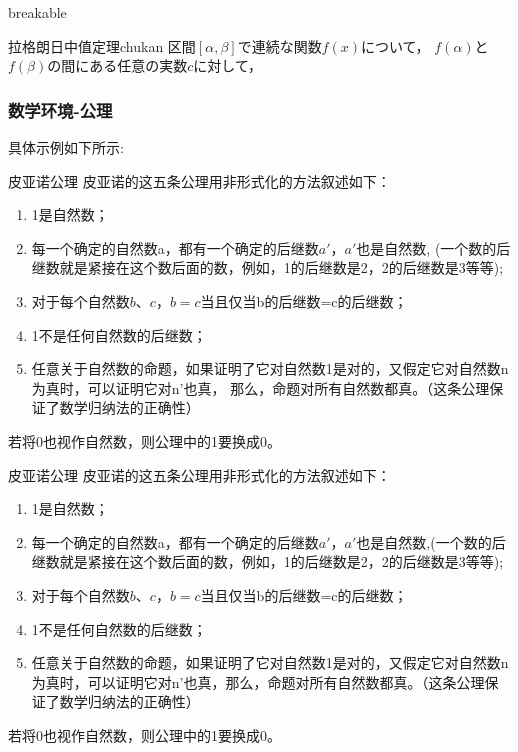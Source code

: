 \begin{tcblisting}{breakable}
\begin{mytheo}{拉格朗日中值定理}{chukan}
    区間$[\alpha,\beta]$で連続な関数$f(x)$について，
    $f(\alpha)$と$f(\beta)$の間にある任意の実数$c$に対して，
\end{mytheo}
\end{tcblisting}

\subsubsection{数学环境-公理}
具体示例如下所示:
\begin{tcblisting}{}
\begin{axiom}{皮亚诺公理}
皮亚诺的这五条公理用非形式化的方法叙述如下：
\begin{enumerate}
\item 1是自然数；
\item 每一个确定的自然数a，都有一个确定的后继数$a'$，$a'$也是自然数, 
(一个数的后继数就是紧接在这个数后面的数，例如，1的后继数是2，2的后继数是3等等);
\item 对于每个自然数$b、c，b=c$当且仅当b的后继数=c的后继数；
\item 1不是任何自然数的后继数；
\item 任意关于自然数的命题，如果证明了它对自然数1是对的，又假定它对自然数n为真时，可以证明它对n'也真， 
那么，命题对所有自然数都真。（这条公理保证了数学归纳法的正确性）
\end{enumerate}
若将0也视作自然数，则公理中的1要换成0。
\end{axiom}
\end{tcblisting}
   \begin{axiom}{皮亚诺公理}
    皮亚诺的这五条公理用非形式化的方法叙述如下：
    \begin{enumerate}
        \item 1是自然数；
        \item 每一个确定的自然数a，都有一个确定的后继数$a'$，$a'$也是自然数,(一个数的后继数就是紧接在这个数后面的数，例如，1的后继数是2，2的后继数是3等等);
        \item 对于每个自然数$b、c，b=c$当且仅当b的后继数=c的后继数；
        \item 1不是任何自然数的后继数；
        \item 任意关于自然数的命题，如果证明了它对自然数1是对的，又假定它对自然数n为真时，可以证明它对n'也真，那么，命题对所有自然数都真。（这条公理保证了数学归纳法的正确性）
    \end{enumerate}
    若将0也视作自然数，则公理中的1要换成0。
\end{axiom}
